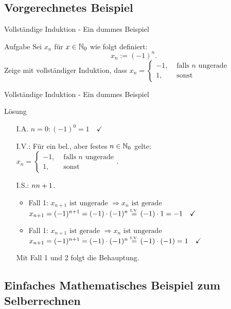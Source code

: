 \subsection{Vorgerechnetes Beispiel}
\begin{frame}{Vollständige Induktion - Ein dummes Beispiel}
	\begin{exampleblock}{Aufgabe}
		Sei $x_n$ für $x \in \mathbb{N}_0$ wie folgt definiert:
		\[
			x_n := (-1)^n.
		\]
		Zeige mit vollständiger Induktion, dass 
		$x_n = 
		\begin{cases}
			-1, &\text{ falls $n$ ungerade}\\
			1, &\text{ sonst}
		\end{cases}$
	\end{exampleblock}
\end{frame}
\begin{frame}{Vollständige Induktion - Ein dummes Beispiel}
	\begin{block}{Lösung}
		\begin{itemize}
			\item[I.A.] $n=0: (-1)^0=1 \quad \checkmark$
			\item[I.V.:] Für ein bel., aber festes $n \in \mathbb{N}_0$ gelte: \\
				 			$x_n = 
					\begin{cases}
						-1, &\text{ falls $n$ ungerade}\\
						1, &\text{ sonst}
					\end{cases}.$
			\item[I.S.:] $n \notStephan{\leadsto} \Stephan{\curvearrowright} n+1$.\\
			\begin{itemize}
				\item Fall 1: $x_{n+1} \text{ ist ungerade } \Rightarrow x_n \text{ ist gerade}$\\
					$x_{n+1} = (-1)^{n+1} = (-1) \cdot (-1)^n \eqtext{I.V.} (-1) \cdot 1 = -1 \quad \checkmark$
				\item Fall 1: $x_{n+1} \text{ ist gerade } \Rightarrow x_n \text{ ist ungerade}$\\
					$x_{n+1} = (-1)^{n+1} = (-1) \cdot (-1)^n \eqtext{I.V.} (-1) \cdot (-1) = 1 \quad \checkmark$
			\end{itemize}
			Mit Fall 1 und 2 folgt die Behauptung. \qedwhite{}
		\end{itemize}
	\end{block}
\end{frame}
\subsection{Einfaches Mathematisches Beispiel zum Selberrechnen}

